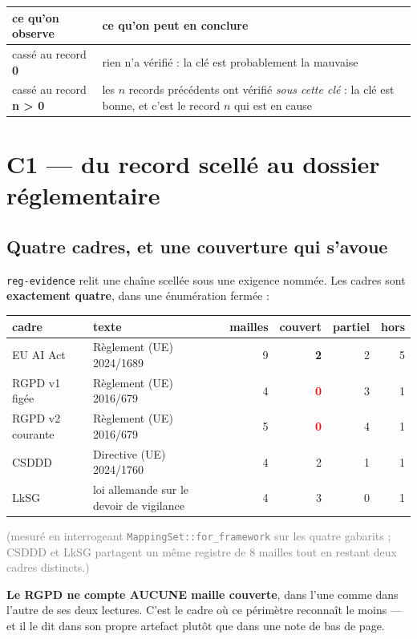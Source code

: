 \documentclass[10pt]{report}
\newcommand{\code}[1]{\texttt{\small #1}}
\newcommand{\ko}[1]{\textcolor{red}{\textbf{#1}}}
\newcommand{\att}[1]{\textcolor{amber}{\textbf{#1}}}
\newcommand{\cun}{\textcolor{c1col}{\textbf{C1}}}
\begin{document}
\begin{longtable}{@{}p{6.2cm} p{8.8cm}@{}}
\toprule \textbf{ce qu'on observe} & \textbf{ce qu'on peut en conclure} \\ \midrule \endhead
cassé au record \textbf{0} & rien n'a vérifié : la clé est probablement la mauvaise \\
cassé au record \textbf{n > 0} & les $n$ records précédents ont vérifié \emph{sous cette clé} : la clé est bonne, et c'est le record $n$ qui est en cause \\
\bottomrule
\end{longtable}

\section{\cun{} --- du record scellé au dossier réglementaire}

\subsection{Quatre cadres, et une couverture qui s'avoue}

\code{reg-evidence} relit une chaîne scellée sous une exigence nommée. Les cadres sont
\textbf{exactement quatre}, dans une énumération fermée :

\begin{longtable}{@{}p{2.4cm} p{4.2cm} r r r r@{}}
\toprule \textbf{cadre} & \textbf{texte} & \textbf{mailles} & \textbf{couvert} & \textbf{partiel} & \textbf{hors} \\ \midrule \endhead
EU AI Act & Règlement (UE) 2024/1689 & 9 & \textbf{2} & 2 & 5 \\
RGPD \footnotesize v1 figée & Règlement (UE) 2016/679 & 4 & \ko{\textbf{0}} & 3 & 1 \\
RGPD \footnotesize v2 courante & Règlement (UE) 2016/679 & 5 & \ko{\textbf{0}} & 4 & 1 \\
CSDDD & Directive (UE) 2024/1760 & 4 & 2 & 1 & 1 \\
LkSG & \footnotesize loi allemande sur le devoir de vigilance & 4 & 3 & 0 & 1 \\
\bottomrule
\end{longtable}

\footnotesize\textcolor{grey}{(mesuré en interrogeant \code{MappingSet::for\_framework} sur les
quatre gabarits ; CSDDD et LkSG partagent un même registre de 8 mailles tout en restant deux cadres
distincts.)}\normalsize

\att{Le RGPD ne compte AUCUNE maille couverte}, dans l'une comme dans l'autre de ses deux lectures.
C'est le cadre où ce périmètre reconnaît le moins --- et il le dit dans son propre artefact plutôt
que dans une note de bas de page.
\end{document}

